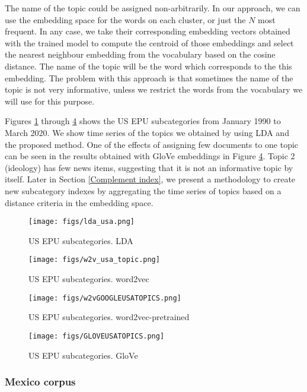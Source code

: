 \documentclass{article}
\begin{document}
The name of the topic could be assigned non-arbitrarily. In our approach, we can use the embedding space for the words on each cluster, or just the $N$ most frequent. In any case, we take their corresponding embedding vectors obtained with the trained model to compute the centroid of those embeddings and select the nearest neighbour embedding from the vocabulary based on the cosine distance. The name of the topic will be the word which corresponds to the this embedding. The problem with this approach is that sometimes the name of the topic is not very informative, unless we restrict the words from the vocabulary we will use for this purpose. 

Figures \ref{fig:chap3.fig23} through \ref{fig:chap3.fig25} shows the US EPU subcategories from January 1990 to March 2020. We show time series of the topics we obtained by using LDA and the proposed method. One of the effects of assigning few documents to one topic can be seen in the results obtained with GloVe embeddings in Figure \ref{fig:chap3.fig25}. Topic 2 (ideology) has few news items, suggesting that it is not an informative topic by itself. Later in Section \ref{Complement index}, we present a methodology to create new subcategory indexes by aggregating the time series of topics based on a distance criteria in the embedding space.

\begin{figure}[H]
  \centering
  \texttt{[image: figs/lda\_usa.png]}
    \caption{US EPU subcategories. LDA}  
  \label{fig:chap3.fig23}
\end{figure}

\begin{figure}[H]
  \centering
  \texttt{[image: figs/w2v\_usa\_topic.png]}
\caption{US EPU subcategories. word2vec}
  \label{fig:chap3.fig23extra}
\end{figure}

\begin{figure}[H]
  \centering
  \texttt{[image: figs/w2vGOOGLEUSATOPICS.png]}
\caption{US EPU subcategories. word2vec-pretrained}  
  \label{fig:chap3.fig24}
\end{figure}

\begin{figure}[H]
  \centering
  \texttt{[image: figs/GLOVEUSATOPICS.png]}
\caption{US EPU subcategories. GloVe}
  \label{fig:chap3.fig25}
\end{figure}

\subsubsection{Mexico corpus}
\end{document}
